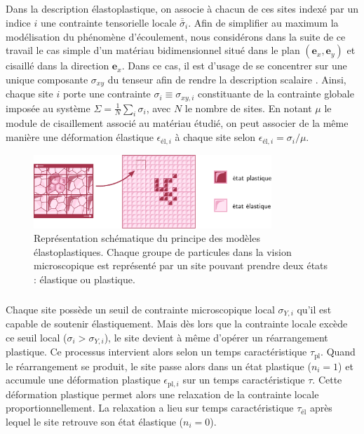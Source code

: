 \subparagraph{}Dans la description élastoplastique, on associe à chacun de ces sites indexé par un indice $i$ une contrainte tensorielle locale $\bar{\bar{\sigma}}_i$. Afin de simplifier au maximum la modélisation du phénomène d'écoulement, nous considérons dans la suite de ce travail le cas simple d'un matériau bidimensionnel situé dans le plan $(\mathbf{e}_x, \mathbf{e}_y)$ et cisaillé dans la direction $\mathbf{e}_x$. Dans ce cas, il est d'usage de se concentrer sur une unique composante $\sigma_{xy}$ du tenseur afin de rendre la description scalaire \cite{picard_slow_2005, liu_driving_2016, lin_scaling_2014, ferrero_criticality_2019}. Ainsi, chaque site $i$ porte une contrainte $\sigma_i\equiv\sigma_{xy,i}$ constituante de la contrainte globale imposée au système $\Sigma = \frac{1}{N}\sum_{i}\sigma_i$, avec $N$ le nombre de sites. En notant $\mu$ le module de cisaillement associé au matériau étudié, on peut associer de la même manière une déformation élastique $\epsilon_{\text{él},i}$ à chaque site selon $\epsilon_{\text{él},i} = \sigma_i/\mu$. 

\begin{figure}[h]
	\centering
	\includegraphics[width=0.8\textwidth]{Chapitre4/Figures/Methode/Mesoscaling.pdf}
	\caption{Représentation schématique du principe des modèles élastoplastiques. Chaque groupe de particules dans la vision microscopique est représenté par un site pouvant prendre deux états : élastique ou plastique.}
	\label{fig:mesoscale}
\end{figure}

\subparagraph{}Chaque site possède un seuil de contrainte microscopique local $\sigma_{Y,i}$ qu'il est capable de soutenir élastiquement. Mais dès lors que la contrainte locale excède ce seuil local ($\sigma_i > \sigma_{Y,i}$), le site devient à même d'opérer un réarrangement plastique. Ce processus intervient alors selon un temps caractéristique $\tau_{\text{pl}}$. Quand le réarrangement se produit, le site passe alors dans un état plastique ($n_i = 1$) et accumule une déformation plastique $\epsilon_{\text{pl},i}$ sur un temps caractéristique $\tau$. Cette déformation plastique permet alors une relaxation de la contrainte locale proportionnellement. La relaxation a lieu sur temps caractéristique $\tau_{\text{él}}$ après lequel le site retrouve son état élastique ($n_i = 0$).

